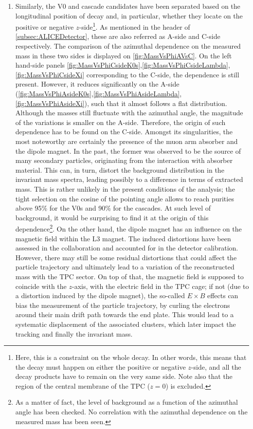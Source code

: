 \begin{enumerate}
\item Similarly, the V0 and cascade candidates have been separated based on the longitudinal position of decay and, in particular, whether they locate on the positive or negative $z$-side\footnote{Here, this is a constraint on the whole decay. In other words, this means that the decay must happen on either the positive or negative $z$-side, and all the decay products have to remain on the very same side. Note also that the region of the central membrane of the TPC ($z = 0$) is excluded.}. As mentioned in the header of \Sec\ref{subsec:ALICEDetector}, these are also referred as A-side and C-side respectively. The comparison of the azimuthal dependence on the measured mass in these two sides is displayed on \fig\ref{fig:MassVsPhiAVsC}. On the left hand-side panels \figs\ref{fig:MassVsPhiCsideK0s},\ref{fig:MassVsPhiCsideLambda},\ref{fig:MassVsPhiCsideXi} corresponding to the C-side, the dependence is still present. However, it reduces significantly on the A-side (\figs\ref{fig:MassVsPhiAsideK0s},\ref{fig:MassVsPhiAsideLambda},\ref{fig:MassVsPhiAsideXi}), such that it almost follows a flat distribution. Although the \rmKzeroS masses still fluctuate with the azimuthal angle, the magnitude of the variations is smaller on the A-side. Therefore, the origin of such dependence has to be found on the C-side. Amongst its singularities, the most noteworthy are certainly the presence of the muon arm absorber and the dipole magnet. In the past, the former was observed to be the source of many secondary particles, originating from the interaction with absorber material. This can, in turn, distort the background distribution in the invariant mass spectra, leading possibly to a difference in terms of extracted mass. This is rather unlikely in the present conditions of the analysis; the tight selection on the cosine of the pointing angle allows to reach purities above 95\% for the V0s and 90\% for the cascades. At such level of background, it would be surprising to find it at the origin of this dependence\footnote{As a matter of fact, the level of background as a function of the azimuthal angle has been checked. No correlation with the azimuthal dependence on the measured mass has been seen.}. On the other hand, the dipole magnet has an influence on the magnetic field within the L3 magnet. The induced distortions have been assessed in the collaboration and accounted for in the detector calibration. However, there may still be some residual distortions that could affect the particle trajectory and ultimately lead to a variation of the reconstructed mass with the TPC sector. On top of that, the magnetic field is supposed to coincide with the $z$-axis, with the electric field in the TPC cage; if not (due to a distortion induced by the dipole magnet), the so-called $E\times B$ effects can bias the measurement of the particle trajectory, by curling the electrons around their main drift path towards the end plate. This would lead to a systematic displacement of the associated clusters, which later impact the tracking and finally the invariant mass.
\end{enumerate}

